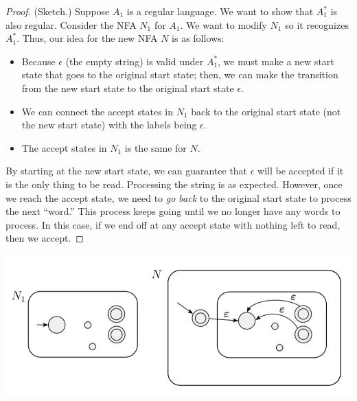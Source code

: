 \documentclass[letterpaper]{article}
\begin{document}
\begin{mdframed}[]
    \begin{proof}
        (Sketch.) Suppose $A_1$ is a regular language. We want to show that $A_1^*$ is also regular. Consider the NFA $N_1$ for $A_1$. We want to modify $N_1$ so it recognizes $A_1^*$. Thus, our idea for the new NFA $N$ is as follows: 
        \begin{itemize}
            \item Because $\epsilon$ (the empty string) is valid under $A_1^*$, we must make a new start state that goes to the original start state; then, we can make the transition from the new start state to the original start state $\epsilon$. 
            \item We can connect the accept states in $N_1$ back to the original start state (not the new start state) with the labels being $\epsilon$.
            \item The accept states in $N_1$ is the same for $N$. 
        \end{itemize}
        By starting at the new start state, we can guarantee that $\epsilon$ will be accepted if it is the only thing to be read. Processing the string is as expected. However, once we reach the accept state, we need to \emph{go back} to the original start state to process the next ``word.'' This process keeps going until we no longer have any words to process. In this case, if we end off at any accept state with nothing left to read, then we accept. 
    \end{proof}
\end{mdframed}

\begin{center}
    \includegraphics[scale=0.5]{assets/star_nfa.png}
\end{center}
\end{document}
